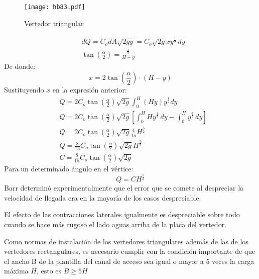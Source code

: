 \begin{figure}[h!]
\centering
  \texttt{[image: hb83.pdf]}
  \caption{Vertedor triangular}
  \label{hb83}
\end{figure}
\begin{align*}
    &dQ = C_o dA \sqrt{2gy} = C_o \sqrt{2g}xy^{\frac{1}{2}}\,dy\\
    &\tan{\left(\frac{\alpha}{2}\right)} = \frac{\frac{x}{2}}{H - y}
\end{align*}
De donde:
\begin{equation*}
    x = 2\tan{\left(\frac{\alpha}{2}\right)}\cdot\left(H - y\right)
\end{equation*}
Sustituyendo $x$ en la expresión anterior:
\begin{align*}
    &Q = 2C_o \tan{\left(\frac{\alpha}{2}\right)} \sqrt{2g} \int_0^H \left(H y\right)y^{\frac{1}{2}} dy\\
    &Q = 2C_o \tan{\left(\frac{\alpha}{2}\right)}\sqrt{2g}\left[\int_0^H Hy^{\frac{1}{2}}\,dy -\int_0^H y^{\frac{3}{2}}\,dy\right]\\
    &Q = 2C_o \tan{\left(\frac{\alpha}{2}\right)}\sqrt{2g} \frac{4}{15}H^{\frac{5}{2}}\\ 
    &Q = \frac{8}{15}C_o \tan{\left(\frac{\alpha}{2}\right)}\sqrt{2g} H^{\frac{5}{2}}\\
    &C = \frac{8}{15}C_o \tan{\left(\frac{\alpha}{2}\right)} \sqrt{2g}
\end{align*}
Para un determinado ángulo en el vértice:
\begin{equation}
    Q = CH^{\frac{5}{2}}
\end{equation}
Barr determinó experimentalmente que el error que se comete al despreciar la velocidad de llegada era en la mayoría de los casos despreciable. 

El efecto de las contracciones laterales igualmente es despreciable sobre todo cuando se hace más rugoso el lado aguas arriba de la placa del vertedor.

Como normas de instalación de los vertedores triangulares además de las de los vertedores rectangulares, es necesario cumplir con la condición importante de que el ancho B de la plantilla del canal de acceso sea igual o mayor a 5 veces la carga máxima $H$, esto es $B\geq 5H$

